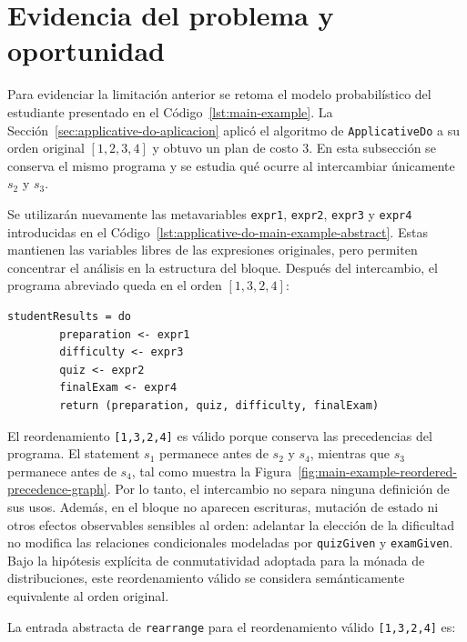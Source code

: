 
\section{Evidencia del problema y oportunidad}

Para evidenciar la limitación anterior se retoma el modelo probabilístico del estudiante presentado en el Código~\ref{lst:main-example}. La Sección~\ref{sec:applicative-do-aplicacion} aplicó el algoritmo de \texttt{ApplicativeDo} a su orden original $[1,2,3,4]$ y obtuvo un plan de costo 3. En esta subsección se conserva el mismo programa y se estudia qué ocurre al intercambiar únicamente $s_2$ y $s_3$.

Se utilizarán nuevamente las metavariables \texttt{expr1}, \texttt{expr2}, \texttt{expr3} y \texttt{expr4} introducidas en el Código~\ref{lst:applicative-do-main-example-abstract}. Estas mantienen las variables libres de las expresiones originales, pero permiten concentrar el análisis en la estructura del bloque. Después del intercambio, el programa abreviado queda en el orden $[1,3,2,4]$:

\begin{lstlisting}[style=haskell,caption={Representación abreviada del modelo probabilístico con los statements \texttt{s2} y \texttt{s3} intercambiados.},label={lst:problema-main-example-reordered-abstract}]
    studentResults = do
        preparation <- expr1
        difficulty <- expr3
        quiz <- expr2
        finalExam <- expr4
        return (preparation, quiz, difficulty, finalExam)
\end{lstlisting}

El reordenamiento \texttt{[1,3,2,4]} es válido porque conserva las precedencias del programa. El statement $s_1$ permanece antes de $s_2$ y $s_4$, mientras que $s_3$ permanece antes de $s_4$, tal como muestra la Figura~\ref{fig:main-example-reordered-precedence-graph}. Por lo tanto, el intercambio no separa ninguna definición de sus usos. Además, en el bloque no aparecen escrituras, mutación de estado ni otros efectos observables sensibles al orden: adelantar la elección de la dificultad no modifica las relaciones condicionales modeladas por \texttt{quizGiven} y \texttt{examGiven}. Bajo la hipótesis explícita de conmutatividad adoptada para la mónada de distribuciones, este reordenamiento válido se considera semánticamente equivalente al orden original.

La entrada abstracta de \texttt{rearrange} para el reordenamiento válido \texttt{[1,3,2,4]} es:

